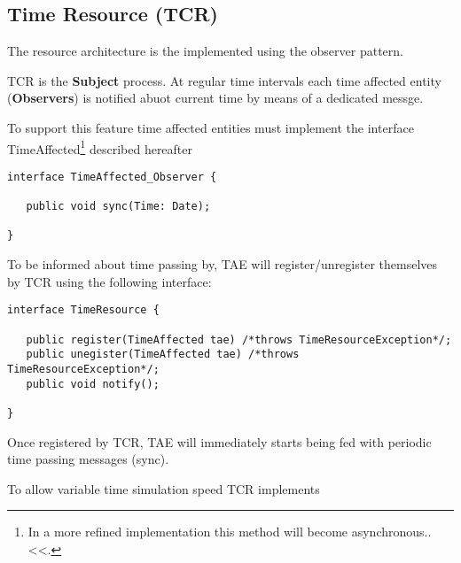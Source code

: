 \subsection{Time Resource (TCR)} 
The resource architecture is the implemented using the observer pattern.

TCR is the \textbf{Subject} process. At regular time intervals each time affected entity (\textbf{Observers}) is notified abuot current time by means of a dedicated messge.

To support this feature time affected entities must implement the interface TimeAffected\footnote{
In a more refined implementation this method will become asynchronous..<<.
} described hereafter

\begin{verbatim}
interface TimeAffected_Observer {

   public void sync(Time: Date);

}
\end{verbatim}

To be informed about time passing by, TAE will register/unregister themselves by TCR using the following interface:

\begin{verbatim}
interface TimeResource {

   public register(TimeAffected tae) /*throws TimeResourceException*/;
   public unegister(TimeAffected tae) /*throws TimeResourceException*/;
   public void notify();

}
\end{verbatim}

Once registered by TCR, TAE will immediately starts being fed with periodic time passing messages (sync).

To allow variable time simulation speed TCR implements